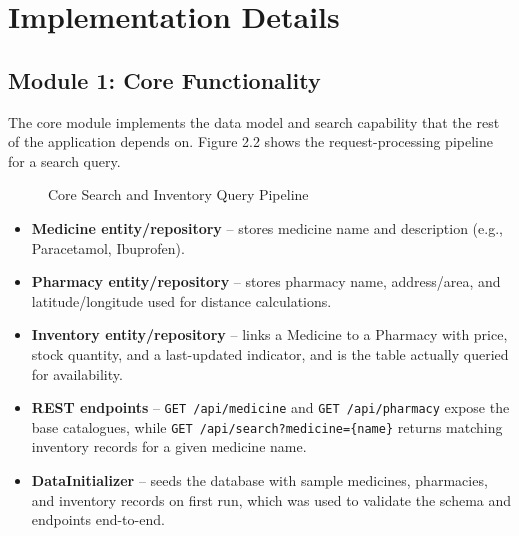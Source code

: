 \documentclass[11pt,a4paper]{report}
\begin{document}
\section{Implementation Details}

\subsection{Module 1: Core Functionality}

The core module implements the data model and search capability that the rest of the application depends on. Figure 2.2 shows the request-processing pipeline for a search query.

\begin{figure}[h!]
\centering
{}
\caption{Core Search and Inventory Query Pipeline}
\end{figure}

\begin{itemize}
    \item \textbf{Medicine entity/repository} -- stores medicine name and description (e.g., Paracetamol, Ibuprofen).
    \item \textbf{Pharmacy entity/repository} -- stores pharmacy name, address/area, and latitude/longitude used for distance calculations.
    \item \textbf{Inventory entity/repository} -- links a Medicine to a Pharmacy with price, stock quantity, and a last-updated indicator, and is the table actually queried for availability.
    \item \textbf{REST endpoints} -- \texttt{GET /api/medicine} and \texttt{GET /api/pharmacy} expose the base catalogues, while \texttt{GET /api/search?medicine=\{name\}} returns matching inventory records for a given medicine name.
    \item \textbf{DataInitializer} -- seeds the database with sample medicines, pharmacies, and inventory records on first run, which was used to validate the schema and endpoints end-to-end.
\end{itemize}
\end{document}
